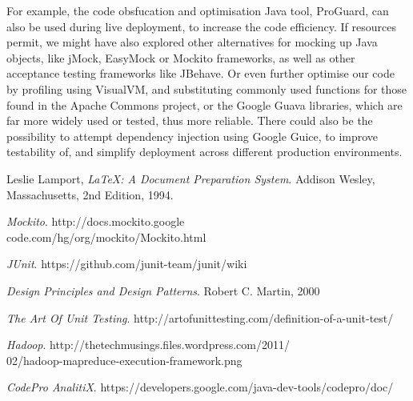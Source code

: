 \documentclass[11pt,twocolumn]{article} %
\begin{document}
For example, the code obsfucation and optimisation Java tool, ProGuard, can also be used
during live deployment, to increase the code efficiency. If resources permit, we might have
also explored other alternatives for mocking up Java objects, like jMock, EasyMock or
Mockito frameworks, as well as other acceptance testing frameworks like JBehave.
Or even further optimise our code by profiling using VisualVM, and substituting commonly
used functions for those found in the Apache Commons project, or the Google Guava
libraries, which are far more widely used or tested, thus more reliable. There could also be
the possibility to attempt dependency injection using Google Guice, to improve testability
of, and simplify deployment across different production environments.


\begin{thebibliography}{9}

  Leslie Lamport,
  \emph{\LaTeX: A Document Preparation System}.
  Addison Wesley, Massachusetts,
  2nd Edition,
  1994.

  \emph{Mockito}.
  http://docs.mockito.google\\code.com/hg/org/mockito/Mockito.html  

  \emph{JUnit}.
  https://github.com/junit-team/junit/wiki

  \emph{Design Principles and Design Patterns}.
  Robert C. Martin,
  2000

  \emph{The Art Of Unit Testing}.
  http://artofunittesting.com/definition-of-a-unit-test/

  \emph{Hadoop}.
  http://thetechmusings.files.wordpress.com/2011/\\02/hadoop-mapreduce-execution-framework.png
  
  \emph{CodePro AnalitiX}.
  https://developers.google.com/java-dev-tools/codepro/doc/ 
  
\end{thebibliography}
\end{document}
